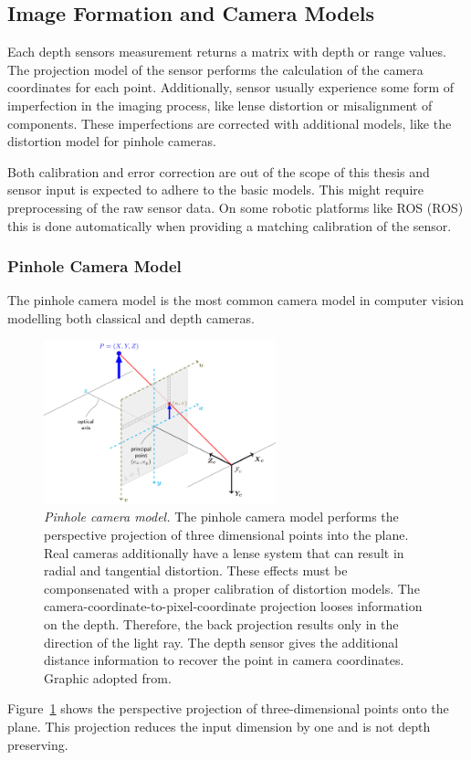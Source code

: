 \subsection{Image Formation and Camera Models}

Each depth sensors measurement returns a matrix with depth or range values.
The projection model of the sensor performs the calculation of the camera coordinates for each point.
Additionally, sensor usually experience some form of imperfection in the imaging process, like lense distortion or misalignment of components.
These imperfections are corrected with additional models, like the distortion model for pinhole cameras.

Both calibration and error correction are out of the scope of this thesis and sensor input is expected to adhere to the basic models.
This might require preprocessing of the raw sensor data.
On some robotic platforms like \acrshort{ROS} (\acrlong{ROS}) this is done automatically when providing a matching calibration of the sensor.

\subsubsection{Pinhole Camera Model}\label{sec:pinhole_model}

The pinhole camera model is the most common camera model in computer vision modelling both classical and depth cameras.

\begin{figure}[H]
    \includegraphics[width=0.6\textwidth]{chapter03/img/pinhole_camera_model.png}
    \caption[Pinhole camera model]{\emph{Pinhole camera model.} The pinhole camera model performs the perspective projection of three dimensional points into the plane. Real cameras additionally have a lense system that can result in radial and tangential distortion. These effects must be componsenated with a proper calibration of distortion models. The camera-coordinate-to-pixel-coordinate projection looses information on the depth. Therefore, the back projection results only in the direction of the light ray. The depth sensor gives the additional distance information to recover the point in camera coordinates. Graphic adopted from\cite{opencv_pinhole}.}\label{fig:pinhole_model}
\end{figure}
Figure~\ref{fig:pinhole_model} shows the perspective projection of three-dimensional points onto the plane.
This projection reduces the input dimension by one and is not depth preserving.

